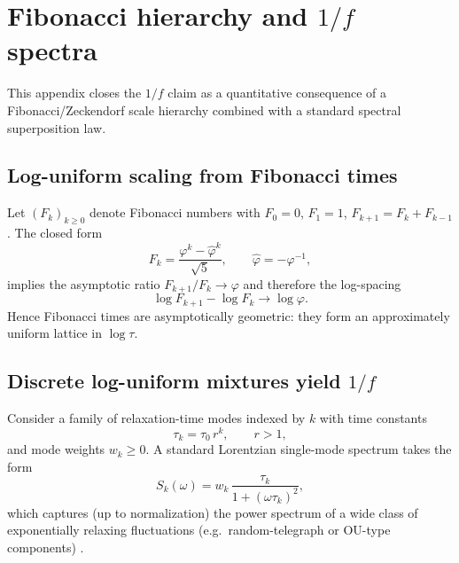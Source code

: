 \section{Fibonacci hierarchy and \texorpdfstring{$1/f$}{1/f} spectra}
\label{app:fibonacci_1f}

This appendix closes the \texorpdfstring{$1/f$}{1/f} claim as a quantitative consequence of a Fibonacci/Zeckendorf scale hierarchy combined with a standard spectral superposition law.

\subsection{Log-uniform scaling from Fibonacci times}

Let $(F_k)_{k\ge 0}$ denote Fibonacci numbers with $F_0=0$, $F_1=1$, $F_{k+1}=F_k+F_{k-1}$. The closed form
\begin{equation}
  F_k=\frac{\varphi^k-\hat\varphi^k}{\sqrt{5}},\qquad \hat\varphi=-\varphi^{-1},
\end{equation}
implies the asymptotic ratio $F_{k+1}/F_k\to\varphi$ and therefore the log-spacing
\begin{equation}
  \log F_{k+1}-\log F_k \to \log\varphi.
\end{equation}
Hence Fibonacci times are asymptotically geometric: they form an approximately uniform lattice in $\log \tau$.

\subsection{Discrete log-uniform mixtures yield \texorpdfstring{$1/f$}{1/f}}

Consider a family of relaxation-time modes indexed by $k$ with time constants
\begin{equation}
  \tau_k = \tau_0\,r^k,\qquad r>1,
\end{equation}
and mode weights $w_k\ge 0$. A standard Lorentzian single-mode spectrum takes the form
\begin{equation}
  S_k(\omega)=w_k\,\frac{\tau_k}{1+(\omega\tau_k)^2},
\end{equation}
which captures (up to normalization) the power spectrum of a wide class of exponentially relaxing fluctuations (e.g.\ random-telegraph or OU-type components) \cite{DuttaHorn1981,Weissman1988}.

